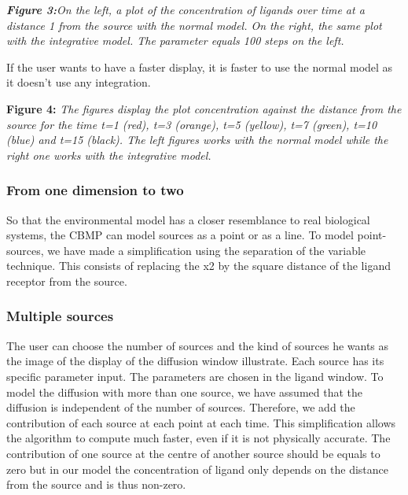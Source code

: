 \documentclass[12pt,a4paper]{report}
\begin{document}
\begin{figure}[H]
\centering
\end{figure}


{\bfseries {\itshape Figure 3:}}{\itshape  On the left, a plot of the 
concentration of ligands over time at a distance 1 from the source with 
the normal model. On the right, the same plot with the integrative 
model. The parameter equals 100 steps on the left. }



If the user wants to have a faster display, it is faster to use the 
normal model as it doesn't use any integration. 





\begin{figure}[H]
\centering
\end{figure}
\begin{figure}[H]
\centering
\end{figure}




{\bfseries Figure 4:} {\itshape The figures display the plot concentration 
against the distance from the source for the time t=1 (red), t=3 
(orange), t=5 (yellow), t=7 (green), t=10 (blue) and t=15 (black). The 
left figures works with the normal model while the right one works with 
the integrative model. } 



\subsubsection{From one dimension to two}
So that the environmental model has a closer resemblance to real 
biological systems, the CBMP can model sources as a point or as a line. 
To model point-sources, we have made a simplification using the 
separation of the variable technique. This consists of replacing the x2 
by the square distance of the ligand receptor from the source.



\subsubsection{Multiple sources}
The user can choose the number of sources and the kind of sources he 
wants as the image of the display of the diffusion window illustrate. 
Each source has its specific parameter input. The parameters are chosen 
in the ligand window. To model the diffusion with more than one source, 
we have assumed that the diffusion is independent of the number of 
sources. Therefore, we add the contribution of each source at each point 
at each time. This simplification allows the algorithm to compute much 
faster, even if it is not physically accurate. The contribution of one 
source at the centre of another source should be equals to zero but in 
our model the concentration of ligand only depends on the distance from 
the source and is thus non-zero. 
\end{document}
